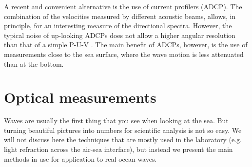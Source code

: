 A recent and convenient alternative is the use of current profilers (ADCP).  The combination of the velocities measured by different acoustic beams, 
allows, in principle, for an interesting measure of the directional spectra. However, the typical noise of up-looking ADCPs does not allow a 
higher angular resolution than that of a simple P-U-V \citep{Herbers&Lentz2010}. The main benefit of ADCPs, however, is the use of measurements close to the sea surface, 
where the wave motion is less attenuated than at the bottom. 

\section{Optical measurements}
Waves are usually the first thing that you see when looking at the sea. But turning beautiful pictures into numbers for scientific analysis is 
not so easy. We will not discuss here the techniques that are mostly used in the laboratory (e.g. light refraction across the air-sea interface), but 
instead we present the main methods in use for application to real ocean waves. 
